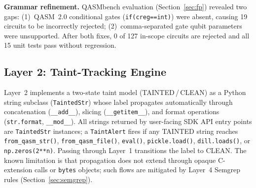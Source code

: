 \documentclass[conference,compsoc]{IEEEtran}
\begin{document}
\noindent
\textbf{Grammar refinement.}
QASMbench evaluation (Section~\ref{sec:fp}) revealed two gaps:
(1)~QASM~2.0 conditional gates (\texttt{if(creg==int)}) were absent,
causing 19 circuits to be incorrectly rejected;
(2)~comma-separated gate qubit parameters were unsupported.
After both fixes, 0 of 127 in-scope circuits are rejected and all
15 unit tests pass without regression.

\subsection{Layer 2: Taint-Tracking Engine}
\noindent Layer~2 implements a two-state taint model (TAINTED\,/\,CLEAN)
as a Python string subclass (\texttt{TaintedStr}) whose label
propagates automatically through concatenation (\texttt{\_\_add\_\_}),
slicing (\texttt{\_\_getitem\_\_}), and format operations
(\texttt{str.format}, \texttt{\_\_mod\_\_}).
All strings returned by user-facing SDK API entry points are
\texttt{TaintedStr} instances; a \texttt{TaintAlert} fires if any
TAINTED string reaches
\texttt{from\_qasm\_str()}, \texttt{from\_qasm\_file()},
\texttt{eval()}, \texttt{pickle.load()}, \texttt{dill.loads()},
or \texttt{np.zeros(2**n)}.
Passing through Layer~1 transitions the label to CLEAN.
The known limitation is that propagation does not extend through
opaque C-extension calls or \texttt{bytes} objects; such flows
are mitigated by Layer~4 Semgrep rules (Section~\ref{sec:semgrep}).
\end{document}
